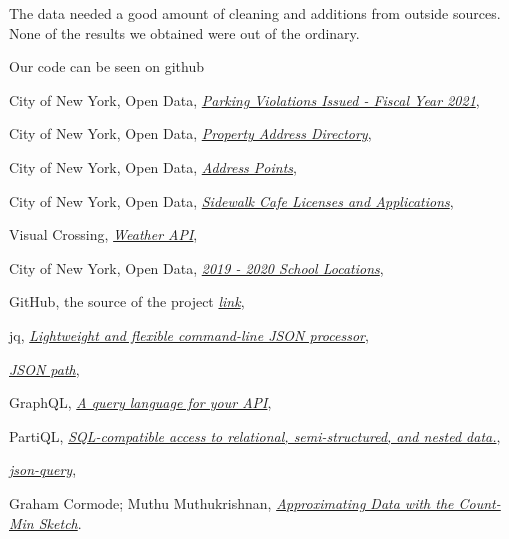 \documentclass[12pt]{fphw}
\begin{document}
The data needed a good amount of cleaning and additions from outside sources. None of the results we obtained were out of the ordinary.

Our code can be seen on github\cite{gitt}


\begin{thebibliography}{9}

  City of New York, Open Data,
  \href{https://data.cityofnewyork.us/City-Government/Parking-Violations-Issued-Fiscal-Year-2021/kvfd-bves}{\emph{Parking Violations Issued - Fiscal Year 2021}},

  City of New York, Open Data,
  \href{https://data.cityofnewyork.us/City-Government/Property-Address-Directory/bc8t-ecyu}{\emph{Property Address Directory}},
  
  City of New York, Open Data,
  \href{https://data.cityofnewyork.us/City-Government/NYC-Address-Points/g6pj-hd8k}{\emph{ Address Points}},
  
  City of New York, Open Data,
  \href{https://data.cityofnewyork.us/Business/Sidewalk-Caf-Licenses-and-Applications/qcdj-rwhu}{\emph{Sidewalk Cafe Licenses and Applications}},

  Visual Crossing,
  \href{https://www.visualcrossing.com/weather/weather-data-services/New\%20York\%20City,USA}{\emph{Weather API}},

  City of New York, Open Data,
  \href{https://data.cityofnewyork.us/Education/2019-2020-School-Locations/wg9x-4ke6}{\emph{2019 - 2020 School Locations}},

  GitHub, the source of the project
  \href{https://github.com/aljazerzen/big-data-project}{\emph{link}},

  jq,
  \href{https://stedolan.github.io/jq/}{\emph{Lightweight and flexible command-line JSON processor}},

  \href{https://goessner.net/articles/JsonPath/}{\emph{JSON path}},

  GraphQL,
  \href{https://graphql.org/}{\emph{A query language for your API}},

  PartiQL,
  \href{https://partiql.org/}{\emph{SQL-compatible access to relational, semi-structured, and nested data.}},

  \href{https://www.npmjs.com/package/json-query}{\emph{json-query}},


  Graham Cormode; Muthu Muthukrishnan,
  \href{https://ieeexplore.ieee.org/document/6042851}{\emph{Approximating Data with the Count-Min Sketch}}.


\end{thebibliography}
\end{document}

